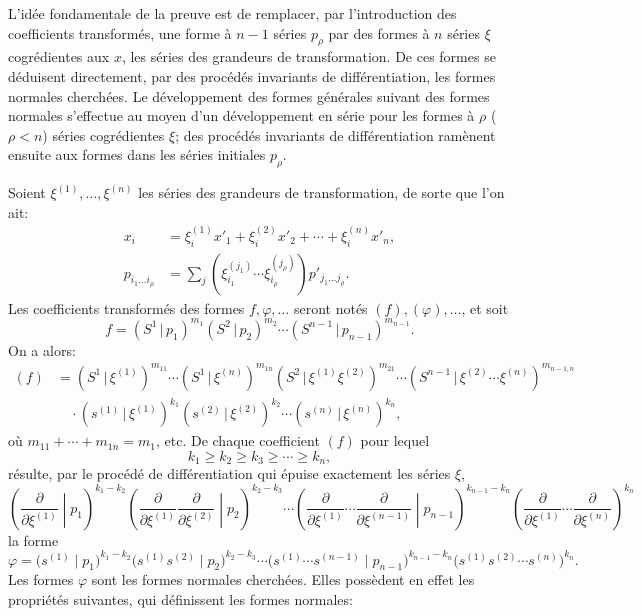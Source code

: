 \documentclass[11pt]{article}
\newcommand{\pair}[2]{(#1\,|\,#2)}
\begin{document}
L'idée fondamentale de la preuve est de remplacer, par l'introduction des coefficients transformés, une forme à $n-1$ séries $p_\rho$ par des formes à $n$ séries $\xi$ cogrédientes aux $x$, les séries des grandeurs de transformation. De ces formes se déduisent directement, par des procédés invariants de différentiation, les formes normales cherchées. Le développement des formes générales suivant des formes normales s'effectue au moyen d'un développement en série pour les formes à $\rho$ ($\rho<n$) séries cogrédientes $\xi$; des procédés invariants de différentiation ramènent ensuite aux formes dans les séries initiales $p_\rho$.

Soient $\xi^{(1)},\ldots,\xi^{(n)}$ les séries des grandeurs de transformation, de sorte que l'on ait:
\begin{equation}
\begin{aligned}
x_i&=\xi_i^{(1)}x'_1+\xi_i^{(2)}x'_2+\cdots+\xi_i^{(n)}x'_n,\\
p_{i_1\ldots i_\rho}&=\sum_j(\xi_{i_1}^{(j_1)}\cdots \xi_{i_\rho}^{(j_\rho)})p'_{j_1\ldots j_\rho}.
\end{aligned}
\tag{47}
\end{equation}
Les coefficients transformés des formes $f,\varphi,\ldots$ seront notés $(f),(\varphi),\ldots$, et soit
\[
 f=\pair{S^1}{p_1}^{m_1}\pair{S^2}{p_2}^{m_2}\cdots\pair{S^{n-1}}{p_{n-1}}^{m_{n-1}}.
\]
On a alors:
\begin{equation}
\begin{aligned}
(f)&=\pair{S^1}{\xi^{(1)}}^{m_{11}}\cdots\pair{S^1}{\xi^{(n)}}^{m_{1n}}
\pair{S^2}{\xi^{(1)}\xi^{(2)}}^{m_{21}}\cdots
\pair{S^{n-1}}{\xi^{(2)}\cdots\xi^{(n)}}^{m_{n-1,n}}\\
&\quad\cdot\pair{s^{(1)}}{\xi^{(1)}}^{k_1}\pair{s^{(2)}}{\xi^{(2)}}^{k_2}\cdots\pair{s^{(n)}}{\xi^{(n)}}^{k_n},
\end{aligned}
\tag{48}
\end{equation}
où $m_{11}+\cdots+m_{1n}=m_1$, etc. De chaque coefficient $(f)$ pour lequel
\begin{equation}
 k_1\ge k_2\ge k_3\ge\cdots\ge k_n,
\tag{49}
\end{equation}
résulte, par le procédé de différentiation qui épuise exactement les séries $\xi$,
\begin{equation}
\left(\frac{\partial}{\partial\xi^{(1)}}\middle|p_1\right)^{k_1-k_2}
\left(\frac{\partial}{\partial\xi^{(1)}}\frac{\partial}{\partial\xi^{(2)}}\middle|p_2\right)^{k_2-k_3}
\cdots
\left(\frac{\partial}{\partial\xi^{(1)}}\cdots\frac{\partial}{\partial\xi^{(n-1)}}\middle|p_{n-1}\right)^{k_{n-1}-k_n}
\left(\frac{\partial}{\partial\xi^{(1)}}\cdots\frac{\partial}{\partial\xi^{(n)}}\right)^{k_n}
\tag{50}
\end{equation}
la forme
\begin{equation}
 \varphi=\bigl(s^{(1)}\mid p_1\bigr)^{k_1-k_2}
 \bigl(s^{(1)}s^{(2)}\mid p_2\bigr)^{k_2-k_3}\cdots
 \bigl(s^{(1)}\cdots s^{(n-1)}\mid p_{n-1}\bigr)^{k_{n-1}-k_n}
 \bigl(s^{(1)}s^{(2)}\cdots s^{(n)}\bigr)^{k_n}.
\tag{51}
\end{equation}
Les formes $\varphi$ sont les formes normales cherchées. Elles possèdent en effet les propriétés suivantes, qui définissent les formes normales:
\end{document}
